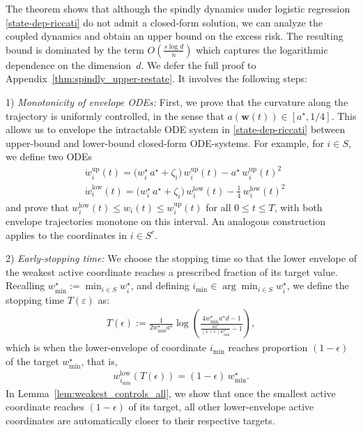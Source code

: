 \documentclass{article}
\theoremstyle{plain}
\theoremstyle{definition}
\theoremstyle{remark}
\begin{document}
The theorem shows that although the spindly dynamics under logistic regression \eqref{state-dep-riccati} do not admit a closed-form solution, we can analyze the coupled dynamics and obtain an upper bound on the excess risk. The resulting bound is dominated by the term $O\!\left(\frac{s \log d}{n}\right)$ which captures the logarithmic dependence on the dimension~$d$. We defer the full proof to Appendix~\ref{thm:spindly_upper-restate}. It involves the following steps:

1) \textit{Monotonicity of envelope ODEs:} First, we prove that the curvature along the trajectory is uniformly controlled, in the sense that $a(\mathbf{w}(t)) \in[a^\star, 1/4]$. This allows us to envelope the intractable ODE system in \eqref{state-dep-riccati} between upper-bound and lower-bound closed-form ODE-systems. For example, for $i \in S$, we define two ODEs
\begin{align}
&  \dot w^{\text{up}}_i(t)=   \bigl(w_i^\star\, a^\star + \zeta_i\bigr)\, w^{\text{up}}_i(t)
- a^\star\, w^{\text{up}}_i(t)^2 \\ 
& \dot w^{\text{low}}_i(t)=   \bigl(w_i^\star\, a^\star + \zeta_i\bigr)\, w^{\text{low}}_i(t)
- \frac{1}{4}\, w^{\text{low}}_i(t)^2
\end{align}
and prove that $w^{\text{low}}_i(t) \leq w_{i}(t) \leq w^{\text{up}}_i(t)$ for all $0\leq t \leq T$, with both envelope trajectories monotone on this interval. An analogous construction applies to the coordinates in $i \in S^{c} $.

2) \textit{ Early-stopping time:}
We choose the stopping time so that the lower envelope of the weakest active coordinate reaches a prescribed fraction of its target value. Recalling
$w^\star_{\min} := \min_{i\in S} w_i^\star$,  and defining $i_{\min} \in \arg\min_{i\in S} w_i^\star$, we define the stopping time $T(\varepsilon)$ as:
\begin{align}
    T(\epsilon)
:=
\frac{1}{2 w^\star_{\min} a^\star}
\log\!\left(
\frac{4 w^\star_{\min} a^\star d - 1}
{\frac{4 a^\star}{(1-\epsilon) w^\star_{\min}} - 1}
\right),
\end{align}
which is when the lower-envelope of coordinate $i_{\min}$ reaches proportion $(1-\epsilon)$ of the target $w^\star_{\min}$, that is, 
\begin{align*}
    w^{\mathrm{low}}_{i_{\min}}(T(\epsilon)) = (1-\epsilon)\, w^\star_{\min}.
\end{align*}
In Lemma~\ref{lem:weakest_controls_all}, we show that once the smallest active coordinate reaches 
$(1-\epsilon)$ of its target, all other lower-envelope active coordinates are automatically closer to their respective targets.
\end{document}
